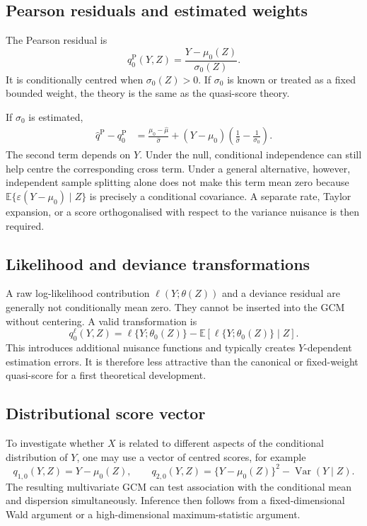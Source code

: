 \documentclass[11pt]{article}
\theoremstyle{definition}
\newcommand{\E}{\mathbb{E}}
\newcommand{\Var}{\operatorname{Var}}
\begin{document}
\subsection{Pearson residuals and estimated weights}

The Pearson residual is
\[
q_0^{\mathrm{P}}(Y,Z)
=\frac{Y-\mu_0(Z)}{\sigma_0(Z)}.
\]
It is conditionally centred when $\sigma_0(Z)>0$. If $\sigma_0$ is known or treated as a fixed
bounded weight, the theory is the same as the quasi-score theory.

If $\sigma_0$ is estimated,
\begin{align*}
\widehat q^{\mathrm{P}}-q_0^{\mathrm{P}}
&=
\frac{\mu_0-\widehat\mu}{\widehat\sigma}
+(Y-\mu_0)
\left(\frac1{\widehat\sigma}-\frac1{\sigma_0}\right).
\end{align*}
The second term depends on $Y$. Under the null, conditional independence can still help
centre the corresponding cross term. Under a general alternative, however, independent
sample splitting alone does not make this term mean zero because
$\E\{\varepsilon(Y-\mu_0)\mid Z\}$ is precisely a conditional covariance. A separate rate,
Taylor expansion, or a score orthogonalised with respect to the variance nuisance is then
required.

\subsection{Likelihood and deviance transformations}

A raw log-likelihood contribution $\ell(Y;\theta(Z))$ and a deviance residual are generally
not conditionally mean zero. They cannot be inserted into the GCM without centering. A valid
transformation is
\[
q_0^{\ell}(Y,Z)
=
\ell\{Y;\theta_0(Z)\}
-
\E[\ell\{Y;\theta_0(Z)\}\mid Z].
\]
This introduces additional nuisance functions and typically creates $Y$-dependent estimation
errors. It is therefore less attractive than the canonical or fixed-weight quasi-score for a
first theoretical development.

\subsection{Distributional score vector}

To investigate whether $X$ is related to different aspects of the conditional distribution of
$Y$, one may use a vector of centred scores, for example
\[
q_{1,0}(Y,Z)=Y-\mu_0(Z),
\qquad
q_{2,0}(Y,Z)=\{Y-\mu_0(Z)\}^2-\Var(Y\mid Z).
\]
The resulting multivariate GCM can test association with the conditional mean and dispersion
simultaneously. Inference then follows from a fixed-dimensional Wald argument or a
high-dimensional maximum-statistic argument.
\end{document}
